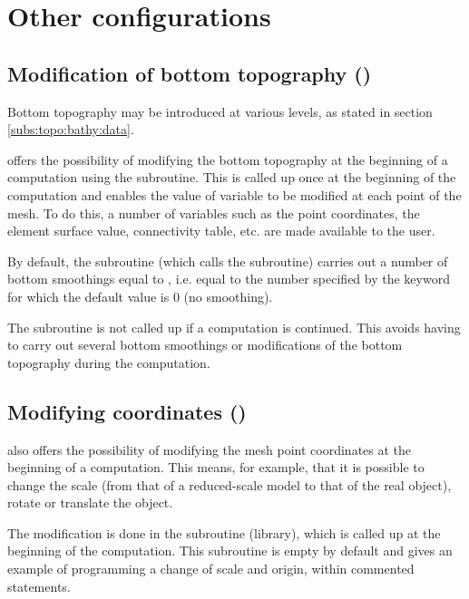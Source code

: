 \chapter{Other configurations}
\label{ch:oth:conf}

\section{Modification of bottom topography ()}
\label{sec:mod:bott:topo}
Bottom topography may be introduced at various levels, as stated
in section \ref{subs:topo:bathy:data}.

 offers the possibility of modifying the bottom topography
at the beginning of a computation using the  subroutine.
This is called up once at the beginning of the computation and enables the value
of variable  to be modified at each point of the mesh.
To do this, a number of variables such as the point coordinates, the element
surface value, connectivity table, etc. are made available to the user.

By default, the  subroutine (which calls the
 subroutine) carries out a number
of bottom smoothings equal to ,
i.e. equal to the number specified by the keyword 
for which the default value is 0 (no smoothing).

The  subroutine is not called up
if a computation is continued.
This avoids having to carry out several bottom smoothings or modifications
of the bottom topography during the computation.


\section{Modifying coordinates ()}

 also offers the possibility of modifying the mesh point coordinates
at the beginning of a computation.
This means, for example, that it is possible to change the scale
(from that of a reduced-scale model to that of the real object),
rotate or translate the object.

The modification is done in the  subroutine
(\bief library), which is called up at the beginning of the computation.
This subroutine is empty by default and gives an example of programming
a change of scale and origin, within commented statements.


